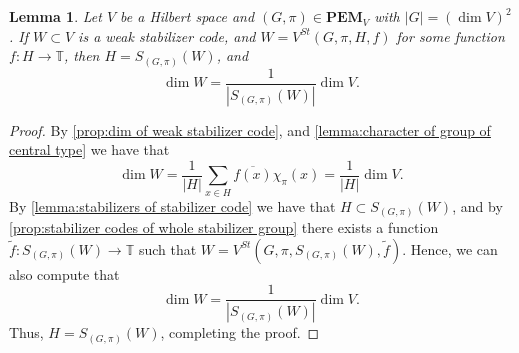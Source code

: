 \documentclass[11pt, oneside, reqno]{amsart}
\newcommand{\bbT}{\mathbb{T}}
\newcommand{\PEM}{\mathbf{PEM}}
\theoremstyle{definition}
\theoremstyle{plain}
\newtheorem{lemma}[definition]{Lemma}
\theoremstyle{remark}
\begin{document}
\begin{lemma}\label{lemma:unique stabilizer of weak stabilizer Clifford code}
    Let $V$ be a Hilbert space and $(G,\pi) \in \PEM_V$ with $|G| = (\dim V)^2$. If $W \subset V$ is a weak stabilizer code, and $W = V^{St}(G,\pi,H,f)$ for some function $f \colon H \to \bbT$, then $H = S_{(G,\pi)}(W)$, and
    \begin{equation*}
        \dim W = \frac{1}{|S_{(G,\pi)}(W)|} \dim V.
    \end{equation*}
\end{lemma}
\begin{proof}
    By \cref{prop:dim of weak stabilizer code}, and \cref{lemma:character of group of central type} we have that
    \begin{equation*}
        \dim W 
        = \frac{1}{|H|}\sum_{x \in H} \overline{f(x)}\chi_{\pi}(x)
        = \frac{1}{|H|} \dim V.
    \end{equation*}
    By \cref{lemma:stabilizers of stabilizer code} we have that $H \subset S_{(G,\pi)}(W)$, and by \cref{prop:stabilizer codes of whole stabilizer group} there exists a function $\tilde{f} \colon S_{(G,\pi)}(W) \to \bbT$ such that $W = V^{St}(G,\pi,S_{(G,\pi)}(W),\tilde{f})$. Hence, we can also compute that
    \begin{equation*}
        \dim W = \frac{1}{|S_{(G,\pi)}(W)|} \dim V.
    \end{equation*}
    Thus, $H = S_{(G,\pi)}(W)$, completing the proof.
\end{proof}
\end{document}
